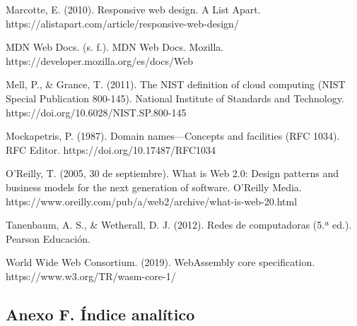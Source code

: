 Marcotte, E. (2010). Responsive web design. A List Apart.
https://alistapart.com/article/responsive-web-design/

MDN Web Docs. (s. f.). MDN Web Docs. Mozilla.
https://developer.mozilla.org/es/docs/Web

Mell, P., \& Grance, T. (2011). The NIST definition of cloud computing
(NIST Special Publication 800-145). National Institute of Standards and
Technology. https://doi.org/10.6028/NIST.SP.800-145

Mockapetris, P. (1987). Domain names---Concepts and facilities (RFC
1034). RFC Editor. https://doi.org/10.17487/RFC1034

O'Reilly, T. (2005, 30 de septiembre). What is Web 2.0: Design patterns
and business models for the next generation of software. O'Reilly Media.
https://www.oreilly.com/pub/a/web2/archive/what-is-web-20.html

Tanenbaum, A. S., \& Wetherall, D. J. (2012). Redes de computadoras (5.ª
ed.). Pearson Educación.

World Wide Web Consortium. (2019). WebAssembly core specification.
https://www.w3.org/TR/wasm-core-1/

\hypertarget{anexo-f.-uxedndice-analuxedtico}{%
\subsection{\texorpdfstring{\textbf{Anexo F. Índice
analítico}}{Anexo F. Índice analítico}}\label{anexo-f.-uxedndice-analuxedtico}}

